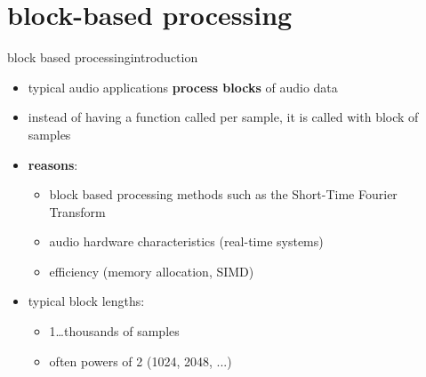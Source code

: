    \section[blocking]{block-based processing}
        \begin{frame}{block based processing}{introduction}
            \begin{itemize}
                \item   typical audio applications \textbf{process blocks} of audio data  
                \item   instead of having a function called per sample, it is called with block of samples
                \bigskip
                \item   \textbf{reasons}:
                    \begin{itemize}
                        \item   block based processing methods such as the Short-Time Fourier Transform
                        \item	audio hardware characteristics (real-time systems)
                        \item	efficiency (memory allocation, SIMD)
                    \end{itemize}
                \smallskip
                \item<2->   typical block lengths:
                    \begin{itemize}
                        \item   1\ldots thousands of samples
                        \item   often powers of 2 (1024, 2048, ...)
                    \end{itemize}
            \end{itemize}
        \end{frame}
        
